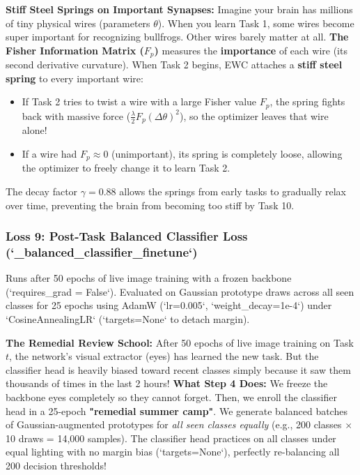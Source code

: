 \documentclass[11pt,a4paper]{article}
\begin{document}
\begin{callout}
\textbf{Stiff Steel Springs on Important Synapses:}\newline
Imagine your brain has millions of tiny physical wires (parameters $\theta$).
When you learn Task 1, some wires become super important for recognizing bullfrogs. Other wires barely matter at all.\newline
\textbf{The Fisher Information Matrix ($F_p$)} measures the \textbf{importance} of each wire (its second derivative curvature).
When Task 2 begins, EWC attaches a \textbf{stiff steel spring} to every important wire:
\begin{itemize}[noitemsep]
    \item If Task 2 tries to twist a wire with a large Fisher value $F_p$, the spring fights back with massive force ($\frac{\lambda}{2} F_p (\Delta \theta)^2$), so the optimizer leaves that wire alone!
    \item If a wire had $F_p \approx 0$ (unimportant), its spring is completely loose, allowing the optimizer to freely change it to learn Task 2.
\end{itemize}
The decay factor $\gamma = 0.88$ allows the springs from early tasks to gradually relax over time, preventing the brain from becoming too stiff by Task 10.
\end{callout}

\subsubsection{Loss 9: Post-Task Balanced Classifier Loss (`_balanced_classifier_finetune`)}
Runs after 50 epochs of live image training with a frozen backbone (`requires_grad = False`). Evaluated on Gaussian prototype draws across all seen classes for 25 epochs using AdamW (`lr=0.005`, `weight_decay=1e-4`) under `CosineAnnealingLR` (`targets=None` to detach margin).

\begin{callout}
\textbf{The Remedial Review School:}\newline
After 50 epochs of live image training on Task $t$, the network's visual extractor (eyes) has learned the new task. But the classifier head is heavily biased toward recent classes simply because it saw them thousands of times in the last 2 hours!\newline
\textbf{What Step 4 Does:} We freeze the backbone eyes completely so they cannot forget. Then, we enroll the classifier head in a 25-epoch \textbf{"remedial summer camp"}. We generate balanced batches of Gaussian-augmented prototypes for \textit{all seen classes equally} (e.g., 200 classes $\times$ 10 draws = 14,000 samples). The classifier head practices on all classes under equal lighting with no margin bias (`targets=None`), perfectly re-balancing all 200 decision thresholds!
\end{callout}
\end{document}
